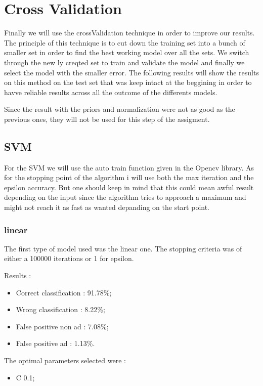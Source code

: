 \section{Cross Validation}

Finally we will use the crossValidation technique in order to improve our results. The principle of this technique is to cut down the training set into a bunch of smaller set in order to find the best working model over all the sets. We switch through the new ly creqted set to train and validate the model and finally we select the model with the smaller error. The following results will show the results on this method on the test set that was keep intact at the beggining in order to havve reliable results across all the outcome of the differents models.

Since the result with the priors and normalization were not as good as the previous ones, they will not be used for this step of the assigment.

\subsection{SVM}

For the SVM we will use the auto train function given in the Opencv library. As for the stopping point of the algorithm i will use both the max iteration and the epsilon accuracy. But one should keep in mind that this could mean awful result depending on the input since the algorithm tries to approach a maximum and might not reach it as fast as wanted depanding on the start point.

\subsubsection{linear}

The first type of model used was the linear one. The stopping criteria was of either a 100000 iterations or 1 for epsilon.

Results :
\begin{itemize}
  \item Correct classification : 91.78\%;
  \item Wrong classification : 8.22\%;
  \item False positive non ad : 7.08\%;
  \item False positive ad : 1.13\%.
\end{itemize}

The optimal parameters selected were :
\begin{itemize}
  \item C 0.1;
\end{itemize}

